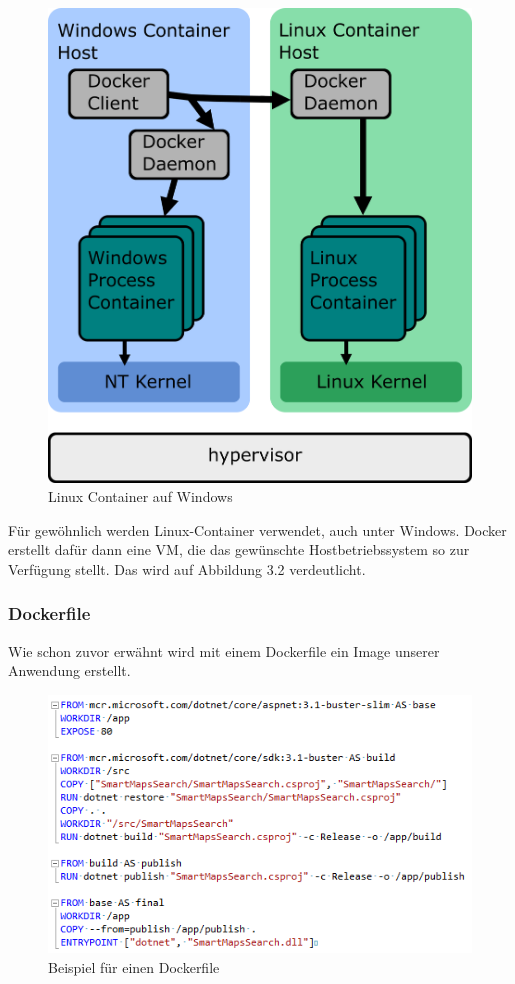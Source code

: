 \documentclass[12pt,a4paper]{scrartcl}
\begin{document}
\begin{figure}[h!]
	\centering
	\includegraphics[scale=2]{DockerWindows.png}
	\caption[https://docs.microsoft.com/de-de/virtualization/windowscontainers/deploy-containers/linux-containers]{Linux Container auf Windows}
\end{figure}

Für gewöhnlich werden Linux-Container verwendet, auch unter Windows. Docker erstellt dafür dann eine VM, die das gewünschte Hostbetriebssystem so zur Verfügung stellt. Das wird auf Abbildung 3.2 verdeutlicht. 

\subsubsection{Dockerfile}

Wie schon zuvor erwähnt wird mit einem Dockerfile ein Image unserer Anwendung erstellt. 

\begin{figure}[h!]
	\centering
	\includegraphics[scale=1]{DockerfileWhite.png}
	\caption[Screenshot]{Beispiel für einen Dockerfile}
\end{figure}
\end{document}
